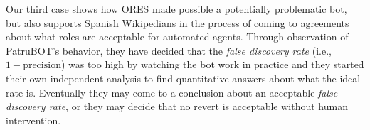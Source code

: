 Our third case shows how ORES made possible a potentially problematic bot, but also supports Spanish Wikipedians in the process of coming to agreements about what roles are acceptable for automated agents.  Through observation of PatruBOT's behavior, they have decided that the \emph{false discovery rate} (i.e., $1 - \text{precision}$) was too high by watching the bot work in practice and they started their own independent analysis to find quantitative answers about what the ideal rate is.  Eventually they may come to a conclusion about an acceptable \emph{false discovery rate}, or they may decide that no revert is acceptable without human intervention.  
